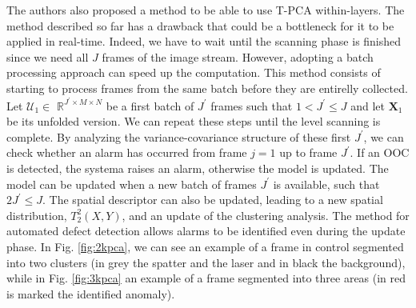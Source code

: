The authors also proposed a method to be able to use T-PCA within-layers. The method described so far has a drawback that could be a bottleneck for it to be applied in real-time. Indeed, we have to wait until the scanning phase is finished since we need all $J$ frames of the image stream. However, adopting a batch processing approach can speed up the computation. This method consists of starting to process frames from the same batch before they are entirelly collected. Let $\mathcal{U}_1 \in$ $\mathbb{R}^{J^{\prime} \times M \times N}$ be a first batch of $J^{\prime}$ frames such that $1<J^{\prime} \leq J$ and let $\mathbf{X}_1$ be its unfolded version. We can repeat these steps until the level scanning is complete. By analyzing the variance-covariance structure of these first $J^{\prime}$, we can check whether an alarm has occurred from frame $j=1$ up to frame $J^{\prime}$. If an OOC is detected, the systema raises an alarm, otherwise the model is updated. The model can be updated when a new batch of frames $J^{\prime}$ is available, such that $2 J^{\prime} \leq J$. The spatial descriptor can also be updated, leading to a new spatial distribution, $T_2^2(X, Y)$, and an update of the clustering analysis. The method for automated defect detection allows alarms to be identified even during the update phase. In Fig. \ref{fig:2kpca}, we can see an example of a frame in control segmented into two clusters (in grey the spatter and the laser and in black the background), while in Fig. \ref{fig:3kpca} an example of a frame segmented into three areas (in red is marked the identified anomaly).

